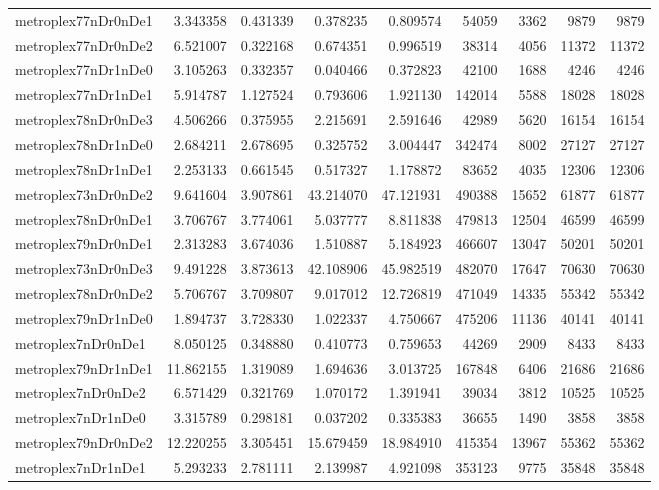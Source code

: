 \begin{longtable}{|l|r|r|r|r|r|r|r|r|}
metroplex77nDr0nDe1 & 3.343358 & 0.431339 & 0.378235 & 0.809574 & 54059 & 3362 & 9879 & 9879 \\
metroplex77nDr0nDe2 & 6.521007 & 0.322168 & 0.674351 & 0.996519 & 38314 & 4056 & 11372 & 11372 \\
metroplex77nDr1nDe0 & 3.105263 & 0.332357 & 0.040466 & 0.372823 & 42100 & 1688 & 4246 & 4246 \\
metroplex77nDr1nDe1 & 5.914787 & 1.127524 & 0.793606 & 1.921130 & 142014 & 5588 & 18028 & 18028 \\
metroplex78nDr0nDe3 & 4.506266 & 0.375955 & 2.215691 & 2.591646 & 42989 & 5620 & 16154 & 16154 \\
metroplex78nDr1nDe0 & 2.684211 & 2.678695 & 0.325752 & 3.004447 & 342474 & 8002 & 27127 & 27127 \\
metroplex78nDr1nDe1 & 2.253133 & 0.661545 & 0.517327 & 1.178872 & 83652 & 4035 & 12306 & 12306 \\
metroplex73nDr0nDe2 & 9.641604 & 3.907861 & 43.214070 & 47.121931 & 490388 & 15652 & 61877 & 61877 \\
metroplex78nDr0nDe1 & 3.706767 & 3.774061 & 5.037777 & 8.811838 & 479813 & 12504 & 46599 & 46599 \\
metroplex79nDr0nDe1 & 2.313283 & 3.674036 & 1.510887 & 5.184923 & 466607 & 13047 & 50201 & 50201 \\
metroplex73nDr0nDe3 & 9.491228 & 3.873613 & 42.108906 & 45.982519 & 482070 & 17647 & 70630 & 70630 \\
metroplex78nDr0nDe2 & 5.706767 & 3.709807 & 9.017012 & 12.726819 & 471049 & 14335 & 55342 & 55342 \\
metroplex79nDr1nDe0 & 1.894737 & 3.728330 & 1.022337 & 4.750667 & 475206 & 11136 & 40141 & 40141 \\
metroplex7nDr0nDe1 & 8.050125 & 0.348880 & 0.410773 & 0.759653 & 44269 & 2909 & 8433 & 8433 \\
metroplex79nDr1nDe1 & 11.862155 & 1.319089 & 1.694636 & 3.013725 & 167848 & 6406 & 21686 & 21686 \\
metroplex7nDr0nDe2 & 6.571429 & 0.321769 & 1.070172 & 1.391941 & 39034 & 3812 & 10525 & 10525 \\
metroplex7nDr1nDe0 & 3.315789 & 0.298181 & 0.037202 & 0.335383 & 36655 & 1490 & 3858 & 3858 \\
metroplex79nDr0nDe2 & 12.220255 & 3.305451 & 15.679459 & 18.984910 & 415354 & 13967 & 55362 & 55362 \\
metroplex7nDr1nDe1 & 5.293233 & 2.781111 & 2.139987 & 4.921098 & 353123 & 9775 & 35848 & 35848 \\

\end{longtable}
